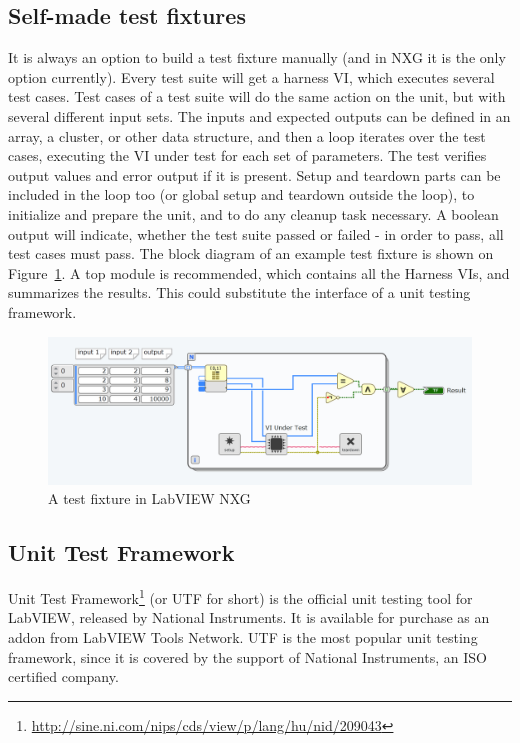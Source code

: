 \subsection{Self-made test fixtures}
It is always an option to build a test fixture manually (and in NXG it is the only option currently). Every test suite will get a harness VI, which executes several test cases. Test cases of a test suite will do the same action on the unit, but with several different input sets. The inputs and expected outputs can be defined in an array, a cluster, or other data structure, and then a loop iterates over the test cases, executing the VI under test for each set of parameters. The test verifies output values and error output if it is present. Setup and teardown parts can be included in the loop too (or global setup and teardown outside the loop), to initialize and prepare the unit, and to do any cleanup task necessary. A boolean output will indicate, whether the test suite passed or failed - in order to pass, all test cases must pass. The block diagram of an example test fixture is shown on Figure~\ref{fig:selfmadetestfixture}.
A top module is recommended, which contains all the Harness VIs, and summarizes the results. This could substitute the interface of a unit testing framework. 

\begin{figure}
\includegraphics[width=150mm,keepaspectratio]{figures/lv_testsuite.png}
\caption{A test fixture in LabVIEW NXG} 
\label{fig:selfmadetestfixture}
\end{figure}

\subsection{Unit Test Framework}
Unit Test Framework\footnote{\url{http://sine.ni.com/nips/cds/view/p/lang/hu/nid/209043}} (or UTF for short) is the official unit testing tool for LabVIEW, released by National Instruments. It is available for purchase as an addon from LabVIEW Tools Network. UTF is the most popular unit testing framework, since it is covered by the support of National Instruments, an ISO certified company.

